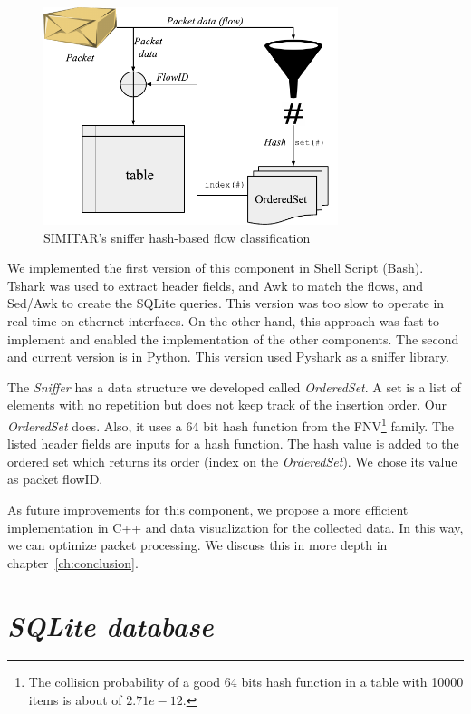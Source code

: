 \begin{figure}[ht!]
        \centering
        \includegraphics[height=2.5in]{figures/ch3/sniffer-classifier}
        \caption{SIMITAR's sniffer hash-based flow classification}
    \label{fig:sniffer}
\end{figure}



We implemented the first version of this component in Shell Script (Bash). Tshark\cite{web-tshark} was used to extract header fields, and Awk to match the flows, and Sed/Awk to create the SQLite queries. This version was too slow to operate in real time on ethernet interfaces. On the other hand, this approach was fast to implement and enabled the implementation of the other components. The second and current version is in Python. This version used Pyshark\cite{web-pyshark} as a sniffer library.

The \textit{Sniffer} has a data structure we developed called \textit{OrderedSet}. A set is a list of elements with no repetition but does not keep track of the insertion order. Our \textit{OrderedSet} does. Also, it uses a 64 bit hash function from the FNV\footnote{The collision probability of a good 64 bits hash function in a table with 10000 items is about of $2.71e-12$.} family. The listed header fields are inputs for a hash function. The hash value is added to the ordered set which returns its order (index on the \textit{OrderedSet}). We chose its value as packet flowID.

As future improvements for this component, we propose a more efficient implementation in C++ and data visualization for the collected data. In this way, we can optimize packet processing. We discuss this in more depth in chapter~\ref{ch:conclusion}.

\section{ \textit{SQLite database} }

